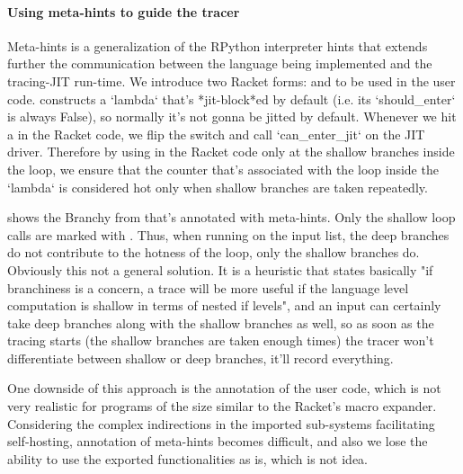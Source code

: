     \begin{paragraph-here}%
      \paragraph{Using meta-hints to guide the tracer} Meta-hints is a generalization of the RPython interpreter hints that extends further the communication between the language being implemented and the tracing-JIT run-time. We introduce two Racket forms:  and  to be used in the user code.  constructs a `lambda` that's *jit-block*ed by default (i.e. its `should\_enter` is always False), so normally it's not gonna be jitted by default. Whenever we hit a  in the Racket code, we flip the switch and call `can\_enter\_jit` on the JIT driver. Therefore by using  in the Racket code only at the shallow branches inside the loop, we ensure that the counter that's associated with the loop inside the `lambda` is considered hot only when shallow branches are taken repeatedly.
    \end{paragraph-here}


    \begin{paragraph-here}%
       shows the Branchy from  that's annotated with meta-hints. Only the shallow loop calls are marked with . Thus, when running on the input list, the deep branches do not contribute to the hotness of the loop, only the shallow branches do. Obviously this not a general solution. It is a heuristic that states basically "if branchiness is a concern, a trace will be more useful if the language level computation is shallow in terms of nested if levels", and an input can certainly take deep branches along with the shallow branches as well, so as soon as the tracing starts (the shallow branches are taken enough times) the tracer won't differentiate between shallow or deep branches, it'll record everything.
    \end{paragraph-here}

    \begin{paragraph-here}%
      One downside of this approach is the annotation of the user code, which is not very realistic for programs of the size similar to the Racket's macro expander. Considering the complex indirections in the imported sub-systems facilitating self-hosting, annotation of meta-hints becomes difficult, and also we lose the ability to use the exported functionalities as is, which is not idea.
    \end{paragraph-here}

